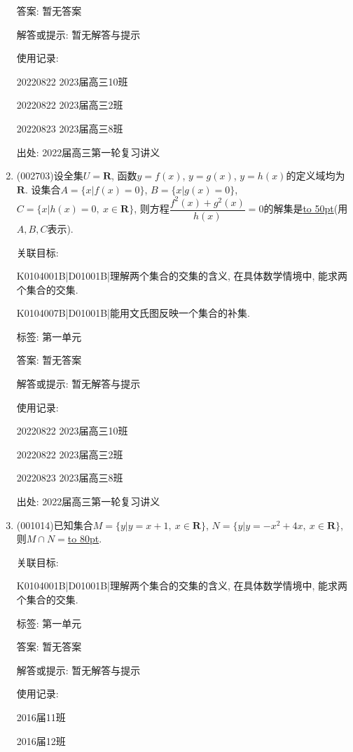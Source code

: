 \documentclass[10pt,a4paper]{article}
\newcommand{\blank}[1]{\underline{\hbox to #1pt{}}}
\begin{document}
\begin{enumerate}[1.]
答案: 暂无答案

解答或提示: 暂无解答与提示

使用记录:

20220822	2023届高三10班	

20220822	2023届高三2班	

20220823	2023届高三8班	


出处: 2022届高三第一轮复习讲义
\item { (002703)}设全集$U=\mathbf{R}$, 函数$y=f(x)$, $y=g(x)$, $y=h(x)$的定义域均为$\mathbf{R}$. 设集合$A=\{x|f(x)=0\}$, $B=\{x|g(x)=0\}$, $C=\{x|h(x)=0, \ x\in \mathbf{R}\}$, 则方程$\dfrac{f^2(x)+g^2(x)}{h(x)}=0$的解集是\blank{50}(用$A,B,C$表示).


关联目标:

K0104001B|D01001B|理解两个集合的交集的含义, 在具体数学情境中, 能求两个集合的交集.

K0104007B|D01001B|能用文氏图反映一个集合的补集.



标签: 第一单元

答案: 暂无答案

解答或提示: 暂无解答与提示

使用记录:

20220822	2023届高三10班	

20220822	2023届高三2班	

20220823	2023届高三8班	


出处: 2022届高三第一轮复习讲义
\item { (001014)}已知集合$M=\{y|y=x+1, \ x \in \mathbf{R}\}$, $N=\{y|y=-x^2+4x,\  x \in \mathbf{R}\}$,
则$M \cap N=$\blank{80}.


关联目标:

K0104001B|D01001B|理解两个集合的交集的含义, 在具体数学情境中, 能求两个集合的交集.



标签: 第一单元

答案: 暂无答案

解答或提示: 暂无解答与提示

使用记录:

2016届11班	

2016届12班	


\end{enumerate}
\end{document}
